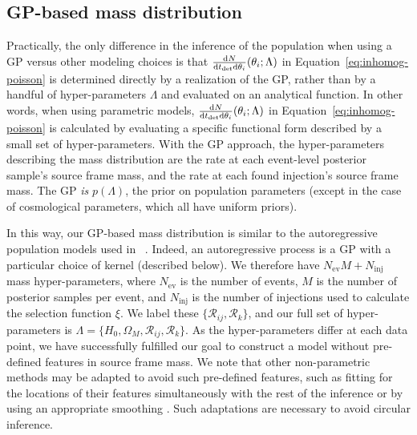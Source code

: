 \documentclass[preprint2,linenumbers]{aastex631}
\begin{document}
\subsection{\Acl{GP}-based mass distribution}
\label{sec:model}

Practically, the only difference in the inference of the population when using a \ac{GP} versus other modeling choices is that $\frac{\text{d} N}{\text{d} t_{\det} \text{d} \theta_i} (\theta_i;\Lambda)$ in Equation~\ref{eq:inhomog-poisson} is determined directly by a realization of the \ac{GP}, rather than by a handful of hyper-parameters $\Lambda$ and evaluated on an analytical function.
In other words, when using parametric models, $\frac{\text{d} N}{\text{d} t_{\det} \text{d} \theta_i} (\theta_i;\Lambda)$ in Equation~\ref{eq:inhomog-poisson} is calculated by evaluating a specific functional form described by a small set of hyper-parameters. 
With the \ac{GP} approach, the hyper-parameters describing the mass distribution are the rate at each event-level posterior sample's source frame mass, and the rate at each found injection's source frame mass.
The \ac{GP} \emph{is} $p(\Lambda)$, the prior on population parameters (except in the case of cosmological parameters, which all have uniform priors).

In this way, our \ac{GP}-based mass distribution is similar to the autoregressive population models used in ~\citet{callister_parameter-free_2023}.
Indeed, an autoregressive process is a \ac{GP} with a particular choice of kernel (described below).
We therefore have $N_{\text{ev}}M + N_{\text{inj}}$ mass hyper-parameters, where $N_{\text{ev}}$ is the number of events, $M$ is the number of posterior samples per event, and $N_{\text{inj}}$ is the number of injections used to calculate the selection function $\xi$.
We label these $\{\mathcal{R}_{ij},\mathcal{R}_k\}$, and our full set of hyper-parameters is $\Lambda=\{H_0, \Omega_M, \mathcal{R}_{ij},\mathcal{R}_k\}$. 
As the hyper-parameters differ at each data point, we have successfully fulfilled our goal to construct a model without pre-defined features in source frame mass.
We note that other non-parametric methods may be adapted to avoid such pre-defined features, such as fitting for the locations of their features simultaneously with the rest of the inference \citep[e.g.][]{tiwari_vamana_2021} or by using an appropriate smoothing \citep[e.g.][]{edelman_cover_2023}. 
Such adaptations are necessary to avoid circular inference.
\end{document}
